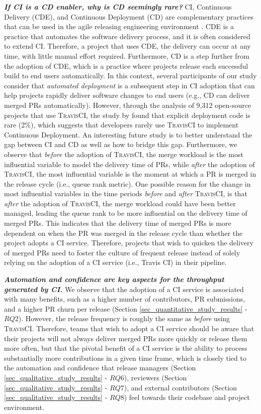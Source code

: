 {\em\bfseries If CI is a CD enabler, why is CD seemingly rare?} CI, Continuous Delivery (CDE), and Continuous Deployment (CD) are complementary practices that can be used in the agile releasing engineering environment \citep{Karvonen201787}. CDE is a practice that automates the software delivery process, and it is often considered to extend CI. Therefore, a project that uses CDE, the delivery can occur at any time, with little manual effort required. Furthermore, CD is a step further from the adoption of CDE, which is a practice where projects release each successful build to end users automatically. 
In this context, several participants of our study consider that 
\textit{automated deployment} is a subsequent step in CI adoption that can help projects rapidly deliver software changes to end users (e.g., CD can deliver merged PRs automatically). However, through the analysis of 9,312 open-source projects that use \textsc{TravisCI}, the study by \cite{gallaba2018use} found that explicit deployment code is rare (2\%), which suggests that developers rarely use \textsc{TravisCI} to implement Continuous Deployment. An interesting future study is to better understand the gap between CI and CD as well as how to bridge this gap.
Furthermore, we observe that \textit{before} the adoption of \textsc{TravisCI}, the merge workload is the most influential variable to model the delivery time of PRs, while \textit{after} the adoption of \textsc{TravisCI}, the most influential variable is the moment at which a PR is merged in the release cycle (i.e., queue rank metric). One possible reason for the change in most influential variables in the time periods \textit{before} and \textit{after} \textsc{TravisCI}, is that \textit{after} the adoption of \textsc{TravisCI}, the merge workload could have been better managed, leading the queue rank to be more influential on the delivery time of merged PRs. This indicates that the delivery time of merged PRs is more dependent on when the PR was merged in the release cycle than whether the project adopts a CI service. Therefore, projects that wish to quicken the delivery of merged PRs need to foster the culture of frequent release instead of solely relying on the adoption of a CI service (i.e., Travis CI) in their pipeline.

{\em\bfseries Automation and confidence are key aspects for the throughput generated by CI.} 
We observe that the adoption of a CI service is associated with many benefits, such as a higher number of contributors, PR submissions, and a higher PR churn per release (Section \ref{sec_quantitative_study_results} - $RQ2$). However, the release frequency is roughly the same as \textit{before} using \textsc{TravisCI}. Therefore, teams that wish to adopt a CI service should be aware that their projects will not always deliver merged PRs more quickly or release them more often, but that the pivotal benefit of a CI service is the ability to process substantially more contributions in a given time frame, which is closely tied to the automation and confidence that release managers (Section \ref{sec_qualitative_study_results} - $RQ6$), reviewers (Section \ref{sec_qualitative_study_results} - $RQ7$), and external contributors (Section \ref{sec_qualitative_study_results} - $RQ8$) feel towards their codebase and project environment. 


